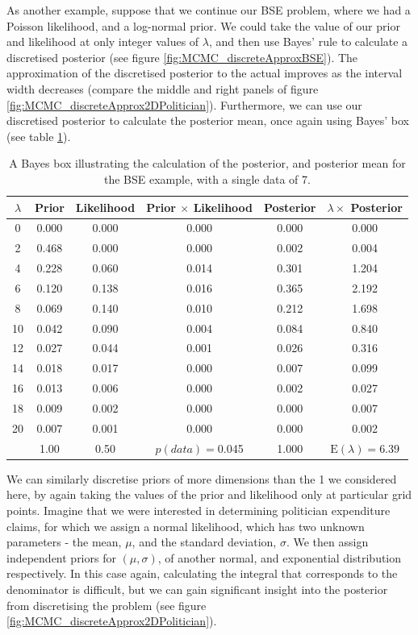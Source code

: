 \documentclass[11pt,fullpage]{book}
\begin{document}
As another example, suppose that we continue our BSE problem, where we had a Poisson likelihood, and a log-normal prior. We could take the value of our prior and likelihood at only integer values of $\lambda$, and then use Bayes' rule to calculate a discretised posterior (see figure \ref{fig:MCMC_discreteApproxBSE}). The approximation of the discretised posterior to the actual improves as the interval width decreases (compare the middle and right panels of figure \ref{fig:MCMC_discreteApprox2DPolitician}). Furthermore, we can use our discretised posterior to calculate the posterior mean, once again using Bayes' box (see table \ref{tab:MCMC_discreteApproxBSE}).


\begin{table}[htbp]
  \centering
    \begin{tabular}{cccccc}
    \toprule
    \textbf{$\lambda$} & \textbf{Prior} & \textbf{Likelihood} & \textbf{Prior $\times$ Likelihood} & \textbf{Posterior} & \textbf{$\lambda \times$ Posterior} \\
    \midrule
    0     & 0.000 & 0.000 & 0.000 & 0.000 & 0.000 \\
    2     & 0.468 & 0.000 & 0.000 & 0.002 & 0.004 \\
    4     & 0.228 & 0.060 & 0.014 & 0.301 & 1.204 \\
    6     & 0.120 & 0.138 & 0.016 & 0.365 & 2.192 \\
    8     & 0.069 & 0.140 & 0.010 & 0.212 & 1.698 \\
    10    & 0.042 & 0.090 & 0.004 & 0.084 & 0.840 \\
    12    & 0.027 & 0.044 & 0.001 & 0.026 & 0.316 \\
    14    & 0.018 & 0.017 & 0.000 & 0.007 & 0.099 \\
    16    & 0.013 & 0.006 & 0.000 & 0.002 & 0.027 \\
    18    & 0.009 & 0.002 & 0.000 & 0.000 & 0.007 \\
    20    & 0.007 & 0.001 & 0.000 & 0.000 & 0.002 \\
    \midrule
          & 1.00  & 0.50  & $p(data)=$0.045 & 1.000 & $\mathrm{E}(\lambda)=6.39$ \\
    \bottomrule
    \end{tabular}%
  \caption{A Bayes box illustrating the calculation of the posterior, and posterior mean for the BSE example, with a single data of 7.}\label{tab:MCMC_discreteApproxBSE}
\end{table}%


We can similarly discretise priors of more dimensions than the 1 we considered here, by again taking the values of the prior and likelihood only at particular grid points. Imagine that we were interested in determining politician expenditure claims, for which we assign a normal likelihood, which has two unknown parameters - the mean, $\mu$, and the standard deviation, $\sigma$. We then assign independent priors for $(\mu,\sigma)$, of another normal, and exponential distribution respectively. In this case again, calculating the integral that corresponds to the denominator is difficult, but we can gain significant insight into the posterior from discretising the problem (see figure \ref{fig:MCMC_discreteApprox2DPolitician}).
\end{document}
